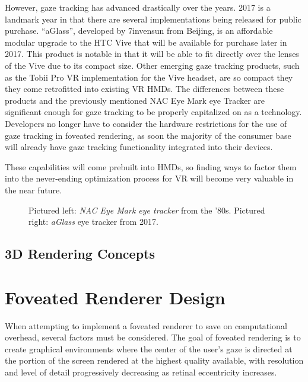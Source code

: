 \documentclass{sig-alternate}
\begin{document}
However, gaze tracking has advanced drastically over the years. 2017 is a landmark year in that there are several implementations being released for public purchase. ``aGlass'', developed by 7invensun from Beijing, is an affordable modular upgrade to the HTC Vive that will be available for purchase later in 2017. This product is notable in that it will be able to fit directly over the lenses of the Vive due to its compact size. Other emerging gaze tracking products, such as the Tobii Pro VR implementation for the Vive headset, are so compact they they come retrofitted into existing VR HMDs. The differences between these products and the previously mentioned NAC Eye Mark eye Tracker are significant enough for gaze tracking to be properly capitalized on as a technology. Developers no longer have to consider the hardware restrictions for the use of gaze tracking in foveated rendering, as soon the majority of the consumer base will already have gaze tracking functionality integrated into their devices.

These capabilities will come prebuilt into HMDs, so finding ways to factor them into the never-ending optimization process for VR will become very valuable in the near future.

\begin{figure}
\caption{Pictured left: \textit{NAC Eye Mark eye tracker} from the '80s. Pictured right: \textit{aGlass} eye tracker from 2017.~\cite{Levoy:Gaze}~\cite{Verge:Adi}}
\label{fig:fig3}
\end{figure}

\subsection{3D Rendering Concepts}
\label{sec:3dRendering}


\section{Foveated Renderer Design}
\label{sec:frDesign}

When attempting to implement a foveated renderer to save on computational overhead, several factors must be considered. The goal of foveated rendering is to create graphical environments where the center of the user's gaze is directed at the portion of the screen rendered at the highest quality available, with resolution and level of detail progressively decreasing as retinal eccentricity increases.
\end{document}
